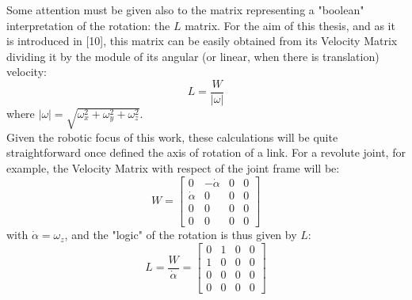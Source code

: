 \documentclass[a4paper,12pt,oneside]{report}
\begin{document}
Some attention must be given also to the matrix representing a "boolean" interpretation of the rotation: the $L$ matrix. For the aim of this thesis, and as it is introduced in [10], this matrix can be easily obtained from its Velocity Matrix dividing it by the module of its angular (or linear, when there is translation) velocity:
\begin{equation}
  L=\frac{W}{|\omega|}
  \label{L_matrix}
\end{equation}
where $|\omega|=\sqrt{\omega_x^2+\omega_y^2+\omega_z^2}$.\\
Given the robotic focus of this work, these calculations will be quite straightforward once defined the axis of rotation of a link. For a revolute joint, for example, the Velocity Matrix with respect of the joint frame will be:
\begin{equation}
  W=\begin{bmatrix}
    0&-\dot{\alpha}&0&0\\
    \dot{\alpha}&0&0&0\\
    0&0&0&0\\
    0&0&0&0
  \end{bmatrix}
\end{equation}
with $\dot{\alpha}=\omega_z$, and the "logic" of the rotation is thus given by $L$:
\begin{equation}
  L=\frac{W}{\dot{\alpha}}=\begin{bmatrix}
    0&1&0&0\\
    1&0&0&0\\
    0&0&0&0\\
    0&0&0&0
  \end{bmatrix}
  \label{L_matrix}
\end{equation}
\end{document}
